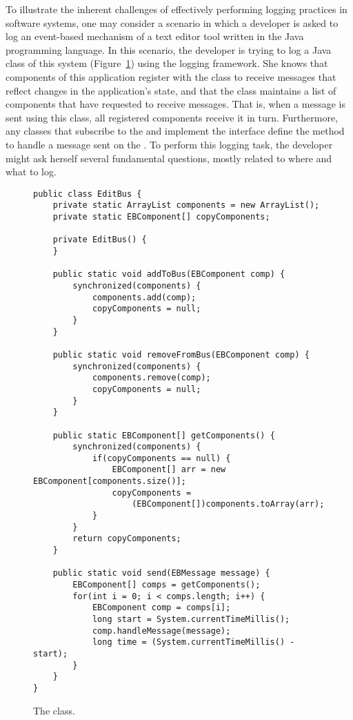 To illustrate the inherent challenges of effectively performing logging practices in software systems, one may consider a scenario in which a developer is asked to log an event-based mechanism of a text editor tool written in the Java programming language. In this scenario, the developer is trying to log a Java class of this system (Figure~\ref{ch2-ex}) using the  logging framework. She knows that components of this application register with the  class to receive messages that reflect changes in the application's state, and that the  class maintains a list of components that have requested to receive messages. That is, when a message is sent using this class, all registered components receive it in turn. Furthermore, any classes that subscribe to the  and implement the  interface define the method  to handle a message sent on the . To perform this logging task, the developer might ask herself several fundamental questions, mostly related to where and what to log.

\begin{figure}[p]
\def\baselinestretch{1}
\begin{lstlisting}
public class EditBus {
    private static ArrayList components = new ArrayList();
    private static EBComponent[] copyComponents;
  
    private EditBus() {
    }
  
    public static void addToBus(EBComponent comp) {
        synchronized(components) {
            components.add(comp);
            copyComponents = null;
        }
    }

    public static void removeFromBus(EBComponent comp) {
        synchronized(components) {
            components.remove(comp);
            copyComponents = null;
        }
    }

    public static EBComponent[] getComponents() {
        synchronized(components) {
            if(copyComponents == null) {
                EBComponent[] arr = new EBComponent[components.size()];
                copyComponents = 
                    (EBComponent[])components.toArray(arr);
            }
        }
        return copyComponents;
    }
  
    public static void send(EBMessage message) {
        EBComponent[] comps = getComponents();
        for(int i = 0; i < comps.length; i++) {
            EBComponent comp = comps[i];
            long start = System.currentTimeMillis();
            comp.handleMessage(message);
            long time = (System.currentTimeMillis() - start);
        }
    }
}
\end{lstlisting}
\caption{The  class.\label{ch2-ex}}
\end{figure}

